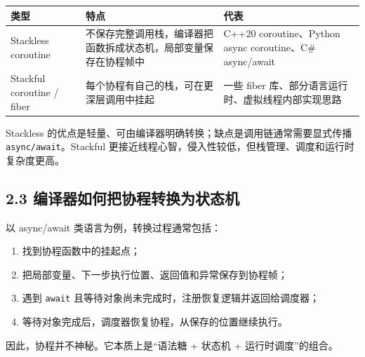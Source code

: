 \documentclass[
  11pt,
  a4paper,
]{article}
\newcounter{none} %
\providecommand{\tightlist}{%
  \setlength{\itemsep}{0pt}\setlength{\parskip}{0pt}}
\begin{document}
{\def\LTcaptype{none} %
\begin{longtable}[]{@{}
  >{\raggedright\arraybackslash}p{}
  >{\raggedright\arraybackslash}p{}
  >{\raggedright\arraybackslash}p{}@{}}
\toprule\noalign{}
\begin{minipage}[b]{\linewidth}\raggedright
类型
\end{minipage} & \begin{minipage}[b]{\linewidth}\raggedright
特点
\end{minipage} & \begin{minipage}[b]{\linewidth}\raggedright
代表
\end{minipage} \\
\midrule\noalign{}
\endhead
\bottomrule\noalign{}
\endlastfoot
Stackless coroutine &
不保存完整调用栈，编译器把函数拆成状态机，局部变量保存在协程帧中 & C++20
coroutine、Python async coroutine、C\# async/await \\
Stackful coroutine / fiber & 每个协程有自己的栈，可在更深层调用中挂起 &
一些 fiber 库、部分语言运行时、虚拟线程内部实现思路 \\
\end{longtable}
}

Stackless 的优点是轻量、可由编译器明确转换；缺点是调用链通常需要显式传播
\texttt{async/await}。Stackful
更接近线程心智，侵入性较低，但栈管理、调度和运行时复杂度更高。

\subsection{2.3
编译器如何把协程转换为状态机}\label{ux7f16ux8bd1ux5668ux5982ux4f55ux628aux534fux7a0bux8f6cux6362ux4e3aux72b6ux6001ux673a}

以 async/await 类语言为例，转换过程通常包括：

\begin{enumerate}
\def\labelenumi{\arabic{enumi}.}
\tightlist
\item
  找到协程函数中的挂起点；
\item
  把局部变量、下一步执行位置、返回值和异常保存到协程帧；
\item
  遇到 \texttt{await} 且等待对象尚未完成时，注册恢复逻辑并返回给调度器；
\item
  等待对象完成后，调度器恢复协程，从保存的位置继续执行。
\end{enumerate}

因此，协程并不神秘。它本质上是``语法糖 + 状态机 + 运行时调度''的组合。
\end{document}
